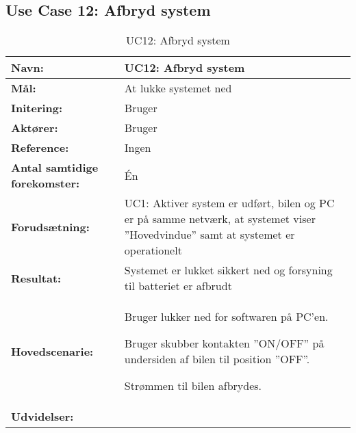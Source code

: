 \subsection{Use Case 12: Afbryd system}
\begin{table}[h]
\begin{tabularx}{\textwidth}{| >{\raggedright\arraybackslash}p{3.3 cm} | >{\raggedright\arraybackslash}X |} \hline

\textbf{Navn:} 						& UC12: Afbryd system																	\\ \hline
\textbf{Mål:}						& At lukke systemet ned 																\\ \hline
\textbf{Initering:}					& Bruger 																				\\ \hline
\textbf{Aktører:} 					& Bruger																				\\ \hline
\textbf{Reference:} 				& Ingen 																				\\ \hline
\textbf{Antal samtidige forekomster:} & Én 																					\\ \hline
\textbf{Forudsætning:} 				& UC1: Aktiver system er udført, bilen og PC er på samme netværk, at systemet viser ''Hovedvindue'' samt at systemet er operationelt 																												\\ \hline
\textbf{Resultat:}					& Systemet er lukket sikkert ned og forsyning til batteriet er afbrudt 					\\ \hline
\textbf{Hovedscenarie:}				& 

\begin{packed_enum}
\item Bruger lukker ned for softwaren på PC'en.
\item Bruger skubber kontakten ''ON/OFF'' på undersiden af bilen til position ''OFF''.
\item Strømmen til bilen afbrydes.
\end{packed_enum} 																											\\ \hline
\textbf{Udvidelser:}				&  
																															\\ \hline
\end{tabularx}
\caption{UC12: Afbryd system}
\label{tbl:UC12}
\end{table}
